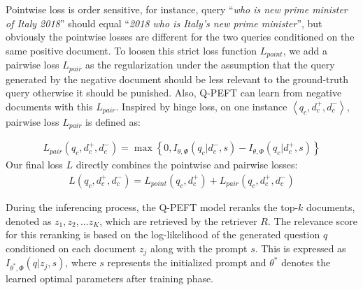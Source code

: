 \documentclass[sigconf,natbib=true,anonymous=false]{acmart}
\begin{document}
Pointwise loss is order sensitive, for instance, query ``\textit{who is new prime minister of Italy 2018}'' should equal ``\textit{2018 who is Italy's new prime minister}'', but obviously the pointwise losses are different for the two queries conditioned on the same positive document. To loosen this strict loss function $L_{point}$, we add a pairwise loss $L_{pair}$ as the regularization under the assumption that the query generated by the negative document should be less relevant to the ground-truth query otherwise it should be punished. Also, Q-PEFT can learn from negative documents with this $L_{pair}$. Inspired by hinge loss, on one instance $\left\langle q_c, d_c^{+}, d_{c}^{-}\right\rangle$, pairwise loss $L_{pair}$ is defined as:


\begin{equation}
\begin{aligned}
L_{pair}(q_{c}, d_{c}^{+}, d_{c}^{-}) = \max \left\{0, I_{\theta, \Phi}(q_{c}| d_{c}^{-}, s) - I_{\theta, \Phi}(q_{c}| d_{c}^{+}, s) \right\}
\end{aligned}
\label{eq: pairwise}
\end{equation}
Our final loss $L$ directly combines the pointwise and pairwise losses:
\begin{equation}
\begin{aligned}
L(q_{c}, d_{c}^{+}, d_{c}^{-})= L_{point}(q_{c}, d_{c}^{+}) + L_{pair}(q_{c}, d_{c}^{+}, d_{c}^{-})
\end{aligned}
\label{eq: our}
\end{equation}


During the inferencing process, the Q-PEFT model reranks the top-$k$ documents, denoted as ${z_{1}, z_{2}, ... z_{K}}$, which are retrieved by the retriever $R$. The relevance score for this reranking is based on the log-likelihood of the generated question $q$ conditioned on each document $z_{j}$ along with the prompt $s$. This is expressed as $I_{\theta^{*}, \Phi}(q| z_{j}, s)$, where $s$ represents the initialized prompt and $\theta^{*}$ denotes the learned optimal parameters after training phase.
\end{document}
